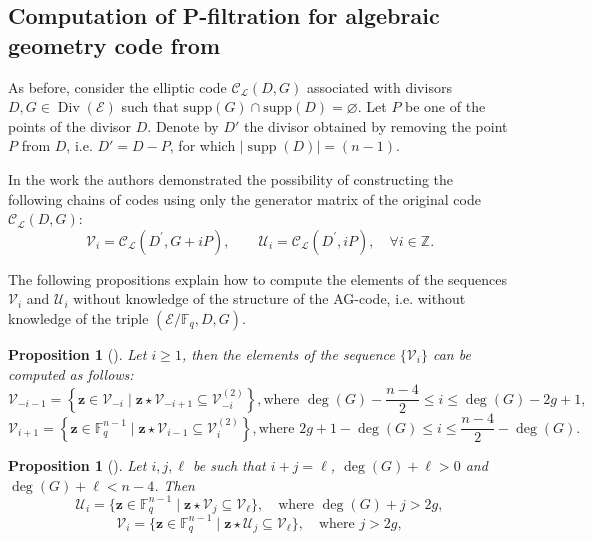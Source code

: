 \documentclass[sn-mathphys-num]{sn-jnl_modified}
\newcommand{\FF}{\ensuremath{\mathbb{F}}}
\newcommand{\cC}{\ensuremath{\mathcal{C}}}
\newcommand{\cL}{\ensuremath{\mathscr{L}}}
\newtheorem{proposition}[theorem]{Proposition}%
\begin{document}
\subsection{Computation of P-filtration for algebraic geometry code from \cite{CMP17}}\label{sec:filtration}

As before, consider the elliptic code $\cC_\cL(D, G)$ associated with divisors $D, G \in \operatorname{Div}(\mathcal{E})$ such that $\text{supp}(G)\cap\text{supp}(D) = \varnothing$. Let $P$ be one of the points of the divisor $D$. Denote by $D'$ the divisor obtained by removing the point $P$ from $D$, i.e. $D' = D - P$, for which $|\operatorname{supp}(D)|= (n - 1)$. 

In the work \cite{CMP17} the authors demonstrated the possibility of constructing the following chains of codes using only the generator matrix of the original code $\cC_\cL(D, G)$:
\[
\mathcal{V}_i = \cC_\cL(D^\prime, G + iP), \quad \quad \mathcal{U}_i = \cC_\cL(D^\prime, iP), \quad \forall i \in \mathbb{Z}.
\] 

The following propositions explain how to compute the elements of the sequences $\mathcal{V}_i$ and $\mathcal{U}_i$ without knowledge of the structure of the AG-code, i.e. without knowledge of the triple $\left(\mathcal{E}/\FF_q, D, G \right)$. 

\begin{proposition}[{\cite[Proposition 20]{CMP17}}]\label{prop:V_i}
Let $ i \geq 1 $, then the elements of the sequence $\{ \mathcal{V}_i \}$ can be computed as follows:  
{\normalsize
\begin{equation*}\label{eq:V_i}
    \mathcal{V}_{-i-1} = \left\{ \mathbf{z} \in \mathcal{V}_{-i} \mid \mathbf{z} \star \mathcal{V}_{-i+1} \subseteq \mathcal{V}^{(2)}_{-i} \right\},  \text{where } \deg(G) - \frac{n-4}{2} \leq i \leq \deg(G) - 2g + 1,
\end{equation*}
}
{{\normalsize
\begin{equation*}\label{eq:V_i_dual}
    \mathcal{V}_{i+1} = \left\{ \mathbf{z} \in \mathbb{F}_{q}^{n-1} \mid \mathbf{z} \star \mathcal{V}_{i-1} \subseteq \mathcal{V}^{(2)}_{i} \right\}, \text{where } 2g + 1 - \deg(G) \leq i \leq \frac{n-4}{2} - \deg(G).
\end{equation*}
}
}
\end{proposition}

\begin{proposition}[{\cite[Proposition 23]{CMP17}}]\label{prop:U_i}
Let $i, j, \ell$ be such that $i + j = \ell$, $\deg(G) + \ell > 0$ and $\deg(G) + \ell < n - 4$. Then
\begin{equation*}%
    \mathcal{U}_i = \{\mathbf{z} \in \mathbb{F}_q^{n-1} \mid \mathbf{z} \star \mathcal{V}_j \subseteq \mathcal{V}_\ell\}, \quad \text{where } \deg(G) + j > 2g,
\end{equation*}
\begin{equation*}
    \mathcal{V}_i = \{\mathbf{z} \in \mathbb{F}_q^{n-1} \mid \mathbf{z} \star \mathcal{U}_j \subseteq \mathcal{V}_\ell\}, \quad \text{where } j > 2g,
\end{equation*}
\end{proposition}
\end{document}
